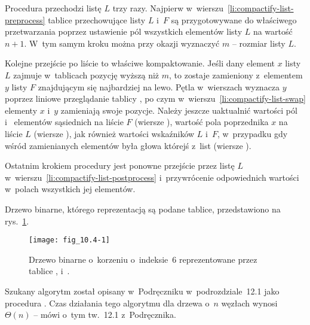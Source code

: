 Procedura przechodzi listę $L$ trzy razy. Najpierw w~wierszu~\ref{li:compactify-list-preprocess} tablice przechowujące listy $L$ i~$F$ są przygotowywane do właściwego przetwarzania poprzez ustawienie pól  wszystkich elementów listy $L$ na wartość $n+1$. W~tym samym kroku można przy okazji wyznaczyć $m$ -- rozmiar listy $L$.

Kolejne przejście po liście to właściwe kompaktowanie. Jeśli dany element $x$ listy $L$ zajmuje w~tablicach pozycję wyższą niż $m$, to zostaje zamieniony z~elementem $y$ listy $F$ znajdującym się najbardziej na lewo. Pętla  w~wierszach \doubledash{\ref{li:compactify-list-while2-begin}}{\ref{li:compactify-list-while2-end}} wyznacza $y$ poprzez liniowe przeglądanie tablicy , po czym w~wierszu~\ref{li:compactify-list-swap} elementy $x$ i~$y$ zamieniają swoje pozycje. Należy jeszcze uaktualnić wartości pól  i~ elementów sąsiednich na liście $F$ (wiersze \doubledash{\ref{li:compactify-list-fix-neighbors-begin}}{\ref{li:compactify-list-fix-neighbors-end}}), wartość pola  poprzednika $x$ na liście $L$ (wiersze \doubledash{\ref{li:compactify-list-fix-predecessor-begin}}{\ref{li:compactify-list-fix-predecessor-end}}), jak również wartości wskaźników $L$ i~$F$, w~przypadku gdy wśród zamienianych elementów była głowa którejś z~list (wiersze \doubledash{\ref{li:compactify-list-fix-heads-begin}}{\ref{li:compactify-list-fix-heads-end}}).

Ostatnim krokiem procedury jest ponowne przejście przez listę $L$ w~wierszu~\ref{li:compactify-list-postprocess} i~przywrócenie odpowiednich wartości w~polach  wszystkich jej elementów.


\exercise %
Drzewo binarne, którego reprezentacją są podane tablice, przedstawiono na rys.~\ref{fig:10.4-1}.
\begin{figure}[ht]
	\begin{center}
		\texttt{[image: fig\_10.4-1]}
	\end{center}
	\caption{Drzewo binarne o~korzeniu o~indeksie~6 reprezentowane przez tablice ,  i~.} \label{fig:10.4-1}
\end{figure}

\exercise %
Szukany algorytm został opisany w~Podręczniku w~podrozdziale~12.1 jako procedura . Czas działania tego algorytmu dla drzewa o~$n$ węzłach wynosi $\Theta(n)$ -- mówi o~tym tw.~12.1 z~Podręcznika.

